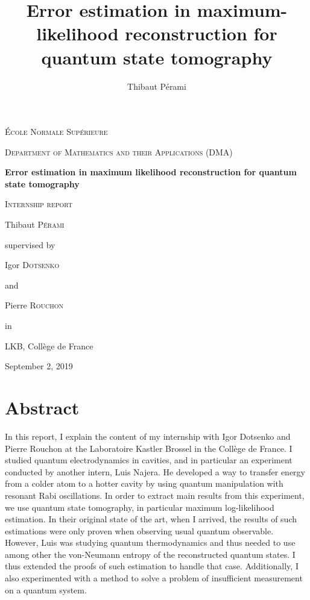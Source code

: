 \documentclass[10pt,a4paper]{report}
\title{Error estimation in maximum-likelihood reconstruction for quantum state tomography}
\author{Thibaut Pérami}
\theoremstyle{plain}
\theoremstyle{definition}
\theoremstyle{remark}
\begin{document}
\begin{titlepage}
  \centering
  {\scshape\huge École Normale Supérieure \par}
  \vspace{0.3cm}
  {\scshape\Large Department of Mathematics and their Applications (DMA) \par}
  \vspace{3cm}
  {\Huge\bfseries Error estimation in maximum likelihood reconstruction for
    quantum state tomography \par}
  \vspace{0.5cm}
  {\scshape\Large Internship report\par}
  \vspace{3cm}
  {\LARGE Thibaut \textsc{Pérami}\par}
  \vfill
  {
    \large
    supervised by\par
    Igor \textsc{Dotsenko}\par
    and\par
    Pierre \textsc{Rouchon}\par
  in\par
  LKB, Collège de France
  }

  \vfill

  {\Large September 2, 2019\par}
\end{titlepage}

\newcommand{\fset}{\ensuremath{\mathop{\text{\textquotesingle}}}}




\chapter*{Abstract}
In this report, I explain the content of my internship with Igor Dotsenko and
Pierre Rouchon at the Laboratoire Kastler Brossel in the Collège de France. I studied quantum
electrodynamics in cavities, and in particular an experiment conducted by another
intern, Luis Najera. He developed a way to transfer energy from a colder atom to a
hotter cavity by using quantum manipulation with resonant Rabi oscillations. In
order to extract main results from this experiment, we use quantum state tomography, in
particular maximum log-likelihood estimation. In their original state of the art, when I
arrived, the results of such estimations were only proven when observing usual
quantum observable. However, Luis was studying quantum thermodynamics and thus
needed to use among other the von-Neumann entropy of the reconstructed quantum states. I thus
extended the proofs of such estimation to handle that case. Additionally, I also experimented
with a method to solve a problem of insufficient measurement on a quantum system.
\end{document}
